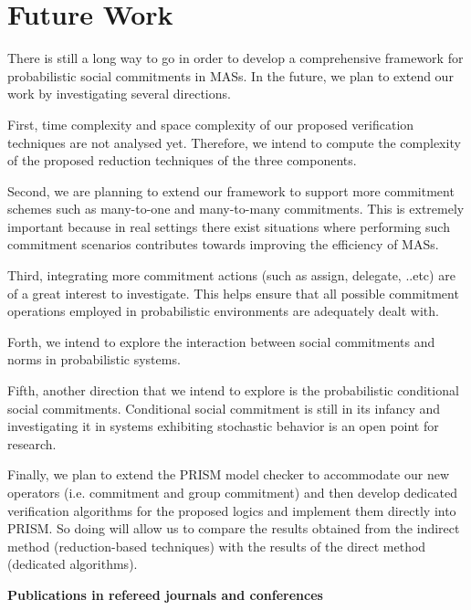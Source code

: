 \section{Future Work}

There is still a long way to go in order to develop a comprehensive framework for probabilistic social commitments in MASs. In the future, we plan to extend our work by investigating several directions.

First, time complexity and space complexity of our proposed verification techniques are not analysed yet. Therefore, we intend to compute the complexity of the proposed reduction techniques of the three components.

Second, we are planning to extend our framework to support more commitment schemes such as many-to-one and many-to-many commitments. This is extremely important because in real settings there exist situations where performing such commitment scenarios contributes towards improving the efficiency of MASs.

Third, integrating more commitment actions (such as assign, delegate, ..etc) \cite{Singh2000} are of a great interest to investigate. This helps ensure that all possible commitment operations employed in probabilistic environments are adequately dealt with.

Forth, we intend to explore the interaction between social commitments and norms in probabilistic systems.

Fifth, another direction that we intend to explore is the probabilistic conditional social commitments. Conditional social commitment is still in  its infancy \cite{Kholy2014} and investigating it in systems exhibiting stochastic behavior is an open point for research.

Finally, we plan to extend the PRISM model checker to accommodate our new operators (i.e. commitment and group commitment) and then develop dedicated verification algorithms for the proposed logics and implement them directly into PRISM. So doing will allow us to compare the results obtained from the indirect method (reduction-based techniques) with the results of the direct method (dedicated algorithms).




\newpage
\textbf{Publications in refereed journals and conferences}

